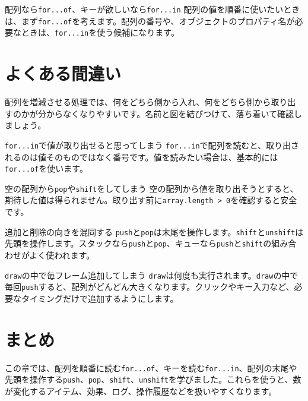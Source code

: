 \begin{pointbox}{配列なら\texttt{for...of}、キーが欲しいなら\texttt{for...in}}
配列の値を順番に使いたいときは、まず\texttt{for...of}を考えます。配列の番号や、オブジェクトのプロパティ名が必要なときは、\texttt{for...in}を使う候補になります。
\end{pointbox}

\section{よくある間違い}

配列を増減させる処理では、何をどちら側から入れ、何をどちら側から取り出すのかが分からなくなりやすいです。名前と図を結びつけて、落ち着いて確認しましょう。

\begin{mistakebox}{\texttt{for...in}で値が取り出せると思ってしまう}
\texttt{for...in}で配列を読むと、取り出されるのは値そのものではなく番号です。値を読みたい場合は、基本的には\texttt{for...of}を使います。
\end{mistakebox}

\begin{mistakebox}{空の配列から\texttt{pop}や\texttt{shift}をしてしまう}
空の配列から値を取り出そうとすると、期待した値は得られません。取り出す前に\texttt{array.length > 0}を確認すると安全です。
\end{mistakebox}

\begin{mistakebox}{追加と削除の向きを混同する}
\texttt{push}と\texttt{pop}は末尾を操作します。\texttt{shift}と\texttt{unshift}は先頭を操作します。スタックなら\texttt{push}と\texttt{pop}、キューなら\texttt{push}と\texttt{shift}の組み合わせがよく使われます。
\end{mistakebox}

\begin{mistakebox}{\texttt{draw}の中で毎フレーム追加してしまう}
\texttt{draw}は何度も実行されます。\texttt{draw}の中で毎回\texttt{push}すると、配列がどんどん大きくなります。クリックやキー入力など、必要なタイミングだけで追加するようにします。
\end{mistakebox}

\section{まとめ}

この章では、配列を順番に読む\texttt{for...of}、キーを読む\texttt{for...in}、配列の末尾や先頭を操作する\texttt{push}、\texttt{pop}、\texttt{shift}、\texttt{unshift}を学びました。これらを使うと、数が変化するアイテム、効果、ログ、操作履歴などを扱いやすくなります。

